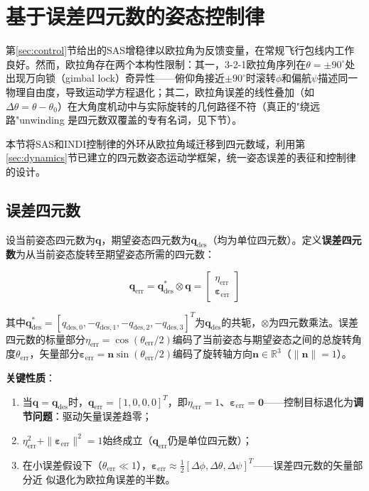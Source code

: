 \section{基于误差四元数的姿态控制律}
\label{sec:quat_control}

第\ref{sec:control}节给出的SAS增稳律以欧拉角为反馈变量，在常规飞行包线内工作良好。然而，欧拉角存在两个本构性限制：其一，3-2-1欧拉角序列在$\theta=\pm90^\circ$处出现万向锁（gimbal lock）奇异性——俯仰角接近$\pm90^\circ$时滚转$\phi$和偏航$\psi$描述同一物理自由度，导致运动学方程退化；其二，欧拉角误差的线性叠加（如$\Delta\theta = \theta - \theta_0$）在大角度机动中与实际旋转的几何路径不符（真正的"绕远路"unwinding 是四元数双覆盖的专有名词，见下节）。

本节将SAS和INDI控制律的外环从欧拉角域迁移到四元数域，利用第\ref{sec:dynamics}节已建立的四元数姿态运动学框架，统一姿态误差的表征和控制律的设计。

\subsection{误差四元数}

设当前姿态四元数为$\mathbf{q}$，期望姿态四元数为$\mathbf{q}_{\text{des}}$（均为单位四元数）。定义\textbf{误差四元数}为从当前姿态旋转至期望姿态所需的四元数\cite{markley2014fundamentals,kuipers1999quaternions}：

\begin{equation}
    \mathbf{q}_{\text{err}} = \mathbf{q}_{\text{des}}^* \otimes \mathbf{q}
    = \begin{bmatrix} \eta_{\text{err}} \\ \boldsymbol{\varepsilon}_{\text{err}} \end{bmatrix}
    \label{eq:quat_err}
\end{equation}

其中$\mathbf{q}_{\text{des}}^* = [q_{\text{des},0}, -q_{\text{des},1}, -q_{\text{des},2}, -q_{\text{des},3}]^T$为$\mathbf{q}_{\text{des}}$的共轭，$\otimes$为四元数乘法。误差四元数的标量部分$\eta_{\text{err}} = \cos(\theta_{\text{err}}/2)$编码了当前姿态与期望姿态之间的总旋转角度$\theta_{\text{err}}$，矢量部分$\boldsymbol{\varepsilon}_{\text{err}} = \mathbf{n}\sin(\theta_{\text{err}}/2)$编码了旋转轴方向$\mathbf{n} \in \mathbb{R}^3$（$\|\mathbf{n}\|=1$）。

\textbf{关键性质}：
\begin{enumerate}[label=(\arabic*)]
    \item 当$\mathbf{q} = \mathbf{q}_{\text{des}}$时，$\mathbf{q}_{\text{err}} = [1, 0, 0, 0]^T$，即$\eta_{\text{err}}=1$、$\boldsymbol{\varepsilon}_{\text{err}} = \mathbf{0}$——控制目标退化为\textbf{调节问题}：驱动矢量误差趋零；
    \item $\eta_{\text{err}}^2 + \|\boldsymbol{\varepsilon}_{\text{err}}\|^2 = 1$始终成立（$\mathbf{q}_{\text{err}}$仍是单位四元数）；
    \item 在小误差假设下（$\theta_{\text{err}} \ll 1$），$\boldsymbol{\varepsilon}_{\text{err}} \approx \frac{1}{2}[\Delta\phi, \Delta\theta, \Delta\psi]^T$——误差四元数的矢量部分近 似退化为欧拉角误差的半数\cite{fresk2013full}。
\end{enumerate}

